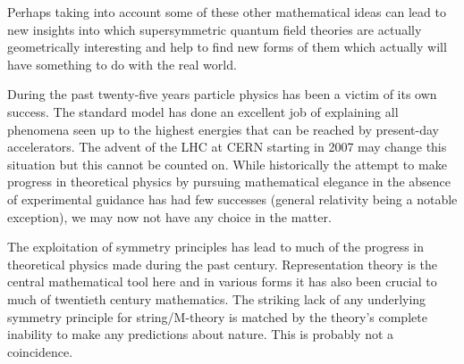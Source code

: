 \documentclass[a4paper,a4paper]{article}
\theoremstyle{conjecture}
\begin{document}
Perhaps taking into account some of these other mathematical ideas can lead to new insights into which
supersymmetric quantum field theories are actually geometrically interesting and help to find new
forms of them which actually will have something to do with the real world.  

During the past twenty-five years particle physics has been a victim of its own success.  The standard
model has done an excellent job of explaining all phenomena seen up to the highest energies
that can be reached by present-day accelerators.  The advent of the LHC at CERN starting in 2007 may
change this situation but this cannot be counted on.  While historically the attempt to make progress
in theoretical physics by pursuing mathematical elegance in the absence of experimental guidance has
had few successes (general relativity being a notable exception), we may now not have any choice in
the matter.

The exploitation of symmetry principles has lead to much of the
progress in theoretical physics made during the past century.  Representation
theory is the central mathematical tool here and in various forms it
has also been crucial to much of twentieth century mathematics.
The striking lack of any underlying symmetry principle for string/M-theory is matched by the
theory's complete inability to make any predictions about nature.  This is probably
not a coincidence.
\end{document}
